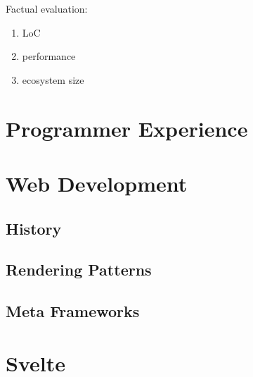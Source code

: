 Factual evaluation:
\begin{enumerate}
    \item LoC
    \item performance
    \item ecosystem size
\end{enumerate}

\section{Programmer Experience}


\section{Web Development}
\label{sec:web-development}

\subsection{History}

\subsection{Rendering Patterns}

\subsection{Meta Frameworks}

\section{Svelte}
\label{sec:svelte}

